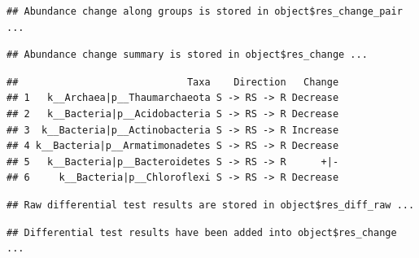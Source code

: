 \documentclass[
]{book}
\newenvironment{Shaded}{\begin{snugshade}}{\end{snugshade}}
\newcommand{\AttributeTok}[1]{\textcolor[rgb]{0.13,0.29,0.53}{#1}}
\newcommand{\ConstantTok}[1]{\textcolor[rgb]{0.56,0.35,0.01}{#1}}
\newcommand{\FunctionTok}[1]{\textcolor[rgb]{0.13,0.29,0.53}{\textbf{#1}}}
\newcommand{\NormalTok}[1]{#1}
\newcommand{\SpecialCharTok}[1]{\textcolor[rgb]{0.81,0.36,0.00}{\textbf{#1}}}
\newcommand{\StringTok}[1]{\textcolor[rgb]{0.31,0.60,0.02}{#1}}
\begin{document}
\begin{verbatim}
## Abundance change along groups is stored in object$res_change_pair ...
\end{verbatim}

\begin{verbatim}
## Abundance change summary is stored in object$res_change ...
\end{verbatim}

\begin{Shaded}
\end{Shaded}

\begin{verbatim}
##                             Taxa    Direction   Change
## 1   k__Archaea|p__Thaumarchaeota S -> RS -> R Decrease
## 2   k__Bacteria|p__Acidobacteria S -> RS -> R Decrease
## 3  k__Bacteria|p__Actinobacteria S -> RS -> R Increase
## 4 k__Bacteria|p__Armatimonadetes S -> RS -> R Decrease
## 5   k__Bacteria|p__Bacteroidetes S -> RS -> R      +|-
## 6     k__Bacteria|p__Chloroflexi S -> RS -> R Decrease
\end{verbatim}

\begin{Shaded}
\end{Shaded}

\begin{verbatim}
## Raw differential test results are stored in object$res_diff_raw ...
\end{verbatim}

\begin{verbatim}
## Differential test results have been added into object$res_change ...
\end{verbatim}

\begin{Shaded}
\end{Shaded}
\end{document}
